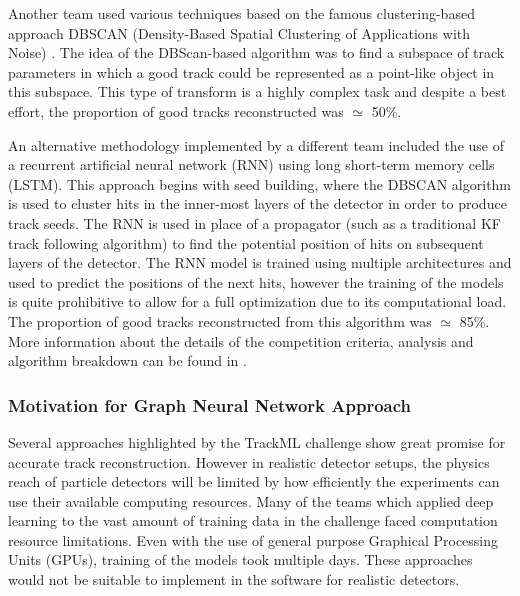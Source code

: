 
Another team used various techniques based on the famous clustering-based approach DBSCAN (Density-Based Spatial Clustering of Applications with Noise) \cite{dbscan}. The idea of the DBScan-based algorithm was to find a subspace of track parameters in which a good track could be represented as a point-like object in this subspace. This type of transform is a highly complex task and despite a best effort, the proportion of good tracks reconstructed was $\simeq$ 50\%. 

An alternative methodology implemented by a different team included the use of a recurrent artificial neural network (RNN) using long short-term memory cells (LSTM). This approach begins with seed building, where the DBSCAN algorithm is used to cluster hits in the inner-most layers of the detector in order to produce track seeds. The RNN is used in place of a propagator (such as a traditional KF track following algorithm) to find the potential position of hits on subsequent layers of the detector. The RNN model is trained using multiple architectures and used to predict the positions of the next hits, however the training of the models is quite prohibitive to allow for a full optimization due to its computational load. The proportion of good tracks reconstructed from this algorithm was $\simeq$ 85\%. More information about the details of the competition criteria, analysis and algorithm breakdown can be found in \cite{Amrouche_2019}.

\subsubsection{Motivation for Graph Neural Network Approach}
Several approaches highlighted by the TrackML challenge show great promise for accurate track reconstruction. However in realistic detector setups, the physics reach of particle detectors will be limited by how efficiently the experiments can use their available computing resources. Many of the teams which applied deep learning to the vast amount of training data in the challenge faced computation resource limitations. Even with the use of general purpose Graphical Processing Units (GPUs), training of the models took multiple days. These approaches would not be suitable to implement in the software for realistic detectors.

